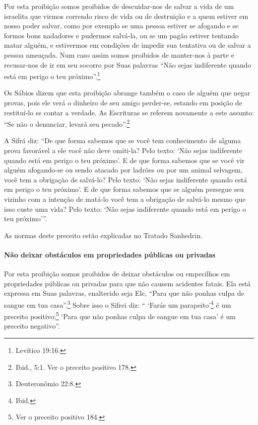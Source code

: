Por esta proibição somos proibidos de descuidar-nos de salvar a vida de
um israelita que virmos correndo risco de vida ou de destruição e a quem
estiver em nosso poder salvar, como por exemplo se uma pessoa estiver se
afogando e se formos bons nadadores e pudermos salvá-la, ou se um pagão
estiver tentando matar alguém, e estivermos em condições de impedir sua
tentativa ou de salvar a pessoa ameaçada. Num caso assim somos proibidos
de manter-nos à parte e recusar-nos de ir em seu socorro por Suas
palavras ``Não sejas indiferente quando está em perigo o teu próximo''.\footnote{Levítico 19:16.}

Os Sábios dizem que esta proibição abrange também o caso de alguém que
negar provas, pois ele verá o dinheiro de seu amigo perder-se, estando
em posição de restituí-lo se contar a verdade. As Escrituras se referem
novamente a este assunto: ``Se não o denunciar, levará seu pecado''.\footnote{Ibid., 5:1. Ver o preceito positivo 178.}

A Sifrá diz: ``De que forma sabemos que se você tem conhecimento de
alguma prova favorável a ele você não deve omiti-la? Pelo texto: `Não
sejas indiferente quando está em perigo o teu próximo'. E de que forma
sabemos que se você vir alguém afogando-se ou sendo atacado por ladrões
ou por um animal selvagem, você tem a obrigação de salvá-lo? Pelo texto:
`Não sejas indiferente quando está em perigo o teu próximo'. E de que
forma sabemos que se alguém persegue seu vizinho com a intenção de
matá-lo você tem a obrigação de salvá-lo mesmo que isso custe uma vida?
Pelo texto: `Não sejas indiferente quando está em perigo o teu
próximo'''.

As normas deste preceito estão explicadas no Tratado Sanhedrin.

\paragraph{Não deixar obstáculos em propriedades públicas ou privadas}

Por esta proibição somos proibidos de deixar obstáculos ou empecilhos
em propriedades públicas ou privadas para que não causem acidentes
fatais. Ela está expressa em Suas palavras, enaltecido seja Ele, ``Para
que não ponhas culpa de sangue em tua casa''.\footnote{Deuteronômio 22:8.} Sobre
isso o Sifrei diz: `` `Farás um parapeito'\footnote{Ibid.} é um preceito
positivo;\footnote{Ver o preceito positivo 184.} `Para que não ponhas culpa de sangue em
tua casa' é um preceito negativo''.

